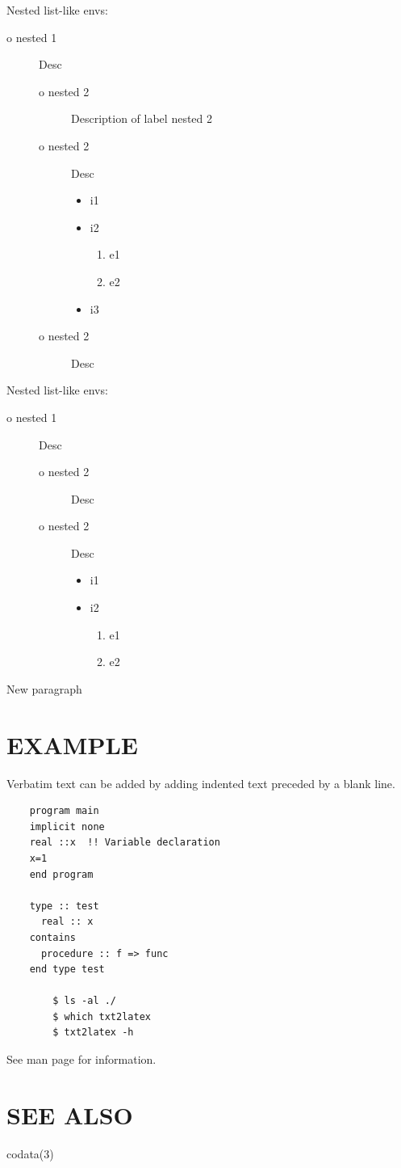 Nested list-like envs:
\begin{description}
\item[o nested 1] Desc
\begin{description}
\item[o nested 2] Description of label nested 2
\item[o nested 2] Desc
\begin{itemize}
\item i1 
\item i2
\begin{enumerate}
\item e1
\item e2
\end{enumerate}
\item i3
\end{itemize}
\item[o nested 2] Desc
\end{description}
\end{description}
  
Nested list-like envs:
\begin{description}
\item[o nested 1] Desc
\begin{description}
\item[o nested 2] Desc
\item[o nested 2] Desc
\begin{itemize}
\item i1 
\item i2
\begin{enumerate}
\item e1
\item e2
\end{enumerate}
\end{itemize}
\end{description}
\end{description}

New paragraph

\section{EXAMPLE}
Verbatim text can be added by adding indented text preceded by a blank line.

\begin{verbatim}
    program main
    implicit none
    real ::x  !! Variable declaration
    x=1
    end program

    type :: test
      real :: x
    contains
      procedure :: f => func
    end type test

        $ ls -al ./
        $ which txt2latex
        $ txt2latex -h

\end{verbatim}
See man page for information.

\section{SEE ALSO}
codata(3)
